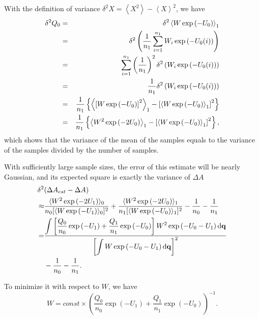With the definition of variance $\delta^2X=\left\langle X^{2}\right\rangle -\left\langle X\right\rangle ^{2}$,
we have 
\begin{eqnarray}
	\delta^2Q_0 & = & \delta^2\left\langle W\exp{(-U_{0})}\right\rangle_{1}\notag\\
	& = & \delta^2\left(\frac{1}{n_1}\sum_{i=1}^{n_1}W_{i}\exp{\left(-U_{0}(i)\right)}\right)\notag\\
	& = & \sum_{i=1}^{n_{1}}\left(\frac{1}{n_{1}}\right)^{2}\delta^2\left(W_{i}\exp{\left(-U_{0}(i)\right)}\right)\notag\\
	& = & \frac{1}{n_{1}}\delta^2\left(W_{i}\exp{\left(-U_{0}(i)\right)}\right)\notag\\
	& = & \frac{1}{n_{1}}\left\{ \left< \left[W\exp{(-U_{0})}\right]^{2}\right>_{1}-\left[\left< W\exp{(-U_{0})}\right>_{1}\right]^{2}\right\}\notag\\
	& = & \frac{1}{n_{1}}\left\{ \left< W^{2}\exp{(-2U_{0})}\right>_{1}-\left[\left< W\exp{(-U_{0})}\right>_{1}\right]^{2}\right\},
\end{eqnarray}
which shows that the variance of the mean of the samples equals to the variance of the samples divided by the number of samples.

With sufficiently large sample sizes, the error of this estimate will
be nearly Gaussian, and its expected square is exactly the variance
of $\Delta A$ 
\begin{align}
	\delta^2 & (\Delta A_{est}-\Delta A)\nonumber \\
	\approx & \frac{\langle W^{2}\exp{(-2U_{1})}\rangle_{0}}{n_{0}[\langle W\exp{(-U_{1})}\rangle_{0}]^{2}}+\frac{\langle W^{2}\exp{(-2U_{0})}\rangle_{1}}{n_{1}[\langle W\exp{(-U_{0})}\rangle_{1}]^{2}}-\frac{1}{n_{0}}-\frac{1}{n_{1}}\nonumber \\
	= & \frac{\displaystyle\int\left[\frac{Q_{0}}{n_{0}}\exp{(-U_{1})}+\frac{Q_{1}}{n_{1}}\exp{(-U_{0})}\right]W^{2}\exp{(-U_{0}-U_{1})}\mathop{}\!\mathrm{d}\mathbf{q}}{\left[\displaystyle\int W\exp{(-U_{0}-U_{1})}\mathop{}\!\mathrm{d}\mathbf{q}\right]^{2}}\notag\\
	  &-\frac{1}{n_{0}}-\frac{1}{n_{1}}.\label{eq:FEM:BAR:expectation}
\end{align}

To minimize it with respect to $W$, we have
\begin{equation}
	W=const\times\left(\frac{Q_{0}}{n_{0}}\exp{(-U_{1})}+\frac{Q_{1}}{n_{1}}\exp{(-U_{0})}\right)^{-1}.
	\label{eq:FEM:BAR:W}
\end{equation}

